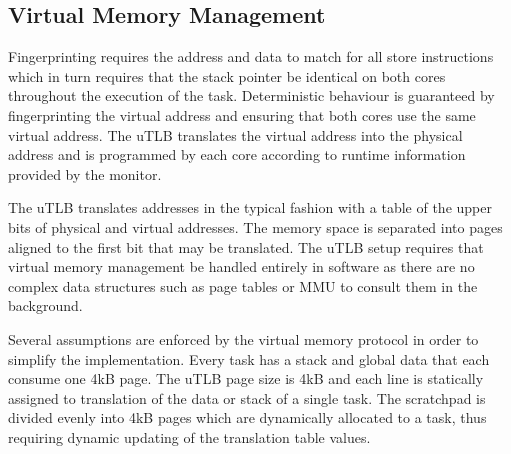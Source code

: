 
\subsection{Virtual Memory Management}
\label{s:virt-mem}
	Fingerprinting requires the address and data to match for all store instructions which in turn requires that the stack pointer be identical on both cores throughout the execution of the task. 
	Deterministic behaviour is guaranteed by fingerprinting the virtual address and ensuring that both cores use the same virtual address. 
	The uTLB translates the virtual address into the physical address and is programmed by each core according to runtime information provided by the monitor. 		
	
	The uTLB translates addresses in the typical fashion with a table of the upper bits of physical and virtual addresses.
	The memory space is separated into pages aligned to the first bit that may be translated.
	The uTLB setup requires that virtual memory management be handled entirely in software as there are no complex data structures such as page tables or MMU to consult them in the background. 
	
	Several assumptions are enforced by the virtual memory protocol in order to simplify the implementation. 
	Every task has a stack and global data that each consume one 4kB page.
	The uTLB page size is 4kB and each line is statically assigned to translation of the data or stack of a single task.
	The scratchpad is divided evenly into 4kB pages which are dynamically allocated to a task, thus requiring dynamic updating of the translation table values.

